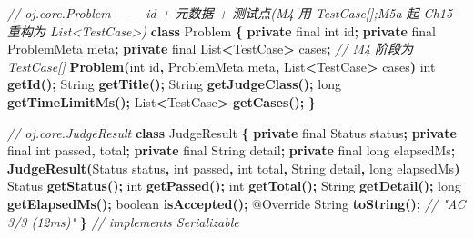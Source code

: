 \documentclass[
  11pt,
]{ctexart}
\newenvironment{Shaded}{\begin{snugshade}}{\end{snugshade}}
\newcommand{\AttributeTok}[1]{\textcolor[rgb]{0.13,0.29,0.53}{#1}}
\newcommand{\BuiltInTok}[1]{#1}
\newcommand{\CommentTok}[1]{\textcolor[rgb]{0.56,0.35,0.01}{\textit{#1}}}
\newcommand{\DataTypeTok}[1]{\textcolor[rgb]{0.13,0.29,0.53}{#1}}
\newcommand{\FunctionTok}[1]{\textcolor[rgb]{0.13,0.29,0.53}{\textbf{#1}}}
\newcommand{\KeywordTok}[1]{\textcolor[rgb]{0.13,0.29,0.53}{\textbf{#1}}}
\newcommand{\NormalTok}[1]{#1}
\newcommand{\OperatorTok}[1]{\textcolor[rgb]{0.81,0.36,0.00}{\textbf{#1}}}
\begin{document}
\begin{Shaded}
\begin{Highlighting}[]
\CommentTok{// oj.core.Problem  —— id + 元数据 + 测试点(M4 用 TestCase[];M5a 起 Ch15 重构为 List\textless{}TestCase\textgreater{})}
\KeywordTok{class}\NormalTok{ Problem }\OperatorTok{\{}
    \KeywordTok{private} \DataTypeTok{final} \DataTypeTok{int}\NormalTok{ id}\OperatorTok{;}
    \KeywordTok{private} \DataTypeTok{final}\NormalTok{ ProblemMeta meta}\OperatorTok{;}
    \KeywordTok{private} \DataTypeTok{final} \BuiltInTok{List}\OperatorTok{\textless{}}\NormalTok{TestCase}\OperatorTok{\textgreater{}}\NormalTok{ cases}\OperatorTok{;}       \CommentTok{// M4 阶段为 TestCase[]}
    \FunctionTok{Problem}\OperatorTok{(}\DataTypeTok{int}\NormalTok{ id}\OperatorTok{,}\NormalTok{ ProblemMeta meta}\OperatorTok{,} \BuiltInTok{List}\OperatorTok{\textless{}}\NormalTok{TestCase}\OperatorTok{\textgreater{}}\NormalTok{ cases}\OperatorTok{)}
    \DataTypeTok{int} \FunctionTok{getId}\OperatorTok{();} \BuiltInTok{String} \FunctionTok{getTitle}\OperatorTok{();} \BuiltInTok{String} \FunctionTok{getJudgeClass}\OperatorTok{();} \DataTypeTok{long} \FunctionTok{getTimeLimitMs}\OperatorTok{();}
    \BuiltInTok{List}\OperatorTok{\textless{}}\NormalTok{TestCase}\OperatorTok{\textgreater{}} \FunctionTok{getCases}\OperatorTok{();}
\OperatorTok{\}}

\CommentTok{// oj.core.JudgeResult}
\KeywordTok{class}\NormalTok{ JudgeResult }\OperatorTok{\{}
    \KeywordTok{private} \DataTypeTok{final}\NormalTok{ Status status}\OperatorTok{;}
    \KeywordTok{private} \DataTypeTok{final} \DataTypeTok{int}\NormalTok{ passed}\OperatorTok{,}\NormalTok{ total}\OperatorTok{;}
    \KeywordTok{private} \DataTypeTok{final} \BuiltInTok{String}\NormalTok{ detail}\OperatorTok{;}
    \KeywordTok{private} \DataTypeTok{final} \DataTypeTok{long}\NormalTok{ elapsedMs}\OperatorTok{;}
    \FunctionTok{JudgeResult}\OperatorTok{(}\NormalTok{Status status}\OperatorTok{,} \DataTypeTok{int}\NormalTok{ passed}\OperatorTok{,} \DataTypeTok{int}\NormalTok{ total}\OperatorTok{,} \BuiltInTok{String}\NormalTok{ detail}\OperatorTok{,} \DataTypeTok{long}\NormalTok{ elapsedMs}\OperatorTok{)}
\NormalTok{    Status }\FunctionTok{getStatus}\OperatorTok{();} \DataTypeTok{int} \FunctionTok{getPassed}\OperatorTok{();} \DataTypeTok{int} \FunctionTok{getTotal}\OperatorTok{();} \BuiltInTok{String} \FunctionTok{getDetail}\OperatorTok{();} \DataTypeTok{long} \FunctionTok{getElapsedMs}\OperatorTok{();}
    \DataTypeTok{boolean} \FunctionTok{isAccepted}\OperatorTok{();}
    \AttributeTok{@Override} \BuiltInTok{String} \FunctionTok{toString}\OperatorTok{();}              \CommentTok{// "AC 3/3 (12ms)"}
\OperatorTok{\}}   \CommentTok{// implements Serializable}


\end{Highlighting}
\end{Shaded}
\end{document}
